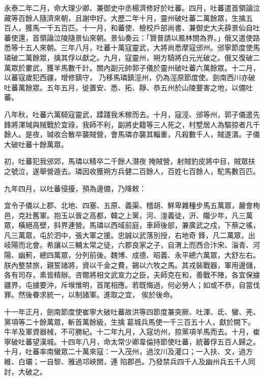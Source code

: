 
\begin{pinyinscope}

 永泰二年二月，命大理少卿、兼御史中丞楊濟修好於吐蕃。四月，吐蕃遣首領論泣藏等百餘人隨濟來朝，且謝申好。大歷二年十月，靈州破吐蕃二萬餘眾，生擒五
 百人，獲馬一千五百匹。十一月，和蕃使、檢校戶部尚書、兼御史大夫薛景仙自吐蕃使還，首領論泣陵隨景仙來朝。景仙奏云：「贊普請以鳳林關為界。」俄又遣使路悉等十五人來朝。三年八月，吐蕃十萬寇靈武，大將尚悉摩寇邠州。邠寧節度使馬璘破二萬餘眾，擒其俘以獻之。九月，寇靈州，朔方騎將白元光破之。俄又復破二萬眾於婁武，獲羊馬數千計。關內副元帥郭子儀於靈州破吐蕃六萬餘眾。十二月，以蕃寇歲犯西疆，增修鎮守，
 乃移馬璘鎮涇州，仍為涇原節度使。劍南西川亦破吐蕃萬餘眾。五年五月，徙置安、悉、拓、靜、恭五州於山陵要害之地，以備吐蕃。



 八年秋，吐蕃六萬騎寇靈武，蹂踐我禾稼而去。十月，寇涇、邠等州，郭子儀遣先鋒將渾瑊與賊戰於宜祿，我師不利，副將史籍等三人死之，村墅居人為驅掠者凡千餘人。是夜，瑊收合散卒襲賊營，會馬璘亦襲其輜重，凡殺數千人，賊遂潰。子儀大破吐蕃十餘萬眾。



 初，吐蕃犯我邠郊，馬璘以精卒二千餘人潛夜
 掩賊營，射賊豹皮將中目，賊眾扶之號泣，遂舉營遁去。璘因收獲朔方兵健二百餘人，百姓七百餘人，駝馬數百匹。



 九年四月，以吐蕃侵擾，預為邊備，乃降敕：



 宜令子儀以上郡、北地、四塞、五原、義渠、稽胡、鮮卑雜種步馬五萬眾，嚴會栒邑，克壯舊軍。抱玉以晉之高都，韓之上黨，河、湟義徒，汧、隴少年，凡三萬眾，橫絕高壁，斜界連營。馬璘以西域前庭，車師後部，兼廣武之戍，下蔡之徭，凡三萬眾，屯於泗中，張大軍之援。忠誠以武落別授，右地奇
 鋒，凡二萬眾，出岐陽而北會。希讓以三輔太常之徒，六郡良家之子，自渭上而西合汴宋、淄青、河陽、幽薊，總四萬眾，分列前後。魏博、成德、昭義、永平總六萬眾，大舒左右。朕內整禁旅，親誓諸將，資以千金之費，錫以六牧之馬。其戎裝戰器，軍用邊儲，各有司存，素皆精辦。咨爾將相文武宣力之臣，夫師克在和，善戰不陣，各宜保據疆界，屯據要沖，斥堠惟明，首尾相應。若既悔過，何必勞人；如或不恭，自當伐罪。然後眷求統一，以制諸軍。進取之宜，
 俟於後命。



 十一年正月，劍南節度使崔寧大破吐蕃故洪等四節度兼突厥、吐渾、氐、蠻、羌、黨項等二十餘萬眾，斬首萬餘級，生擒葛城兵馬使一千三百五十人，獻於闕下。牛羊及軍資器械，不可勝紀。十二年九月，入寇坊州，掠黨項羊馬而去。十月，崔寧破吐蕃望漢城。十四年八月，命太常少卿韋倫持節使吐蕃，統蕃俘五百人歸之。十月，吐蕃率南蠻眾二十萬來寇：一入茂州，過汶川及灌口；一入扶、文，過方維、白壩；一自黎、雅過邛峽關，連
 陷郡邑。乃發禁兵四千人及幽州兵五千人同討，大破之。




\end{pinyinscope}
